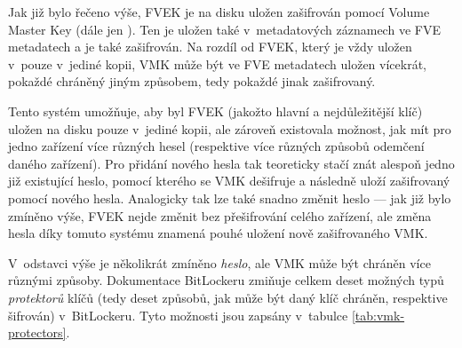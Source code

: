 
\label{sec:vmk}

Jak již bylo řečeno výše, FVEK je na disku uložen zašifrován pomocí Volume Master Key (dále jen ). Ten je uložen také v~metadatových záznamech ve FVE metadatech a je také zašifrován. Na rozdíl od FVEK, který je vždy uložen v~pouze v~jediné kopii, VMK může být ve FVE metadatech uložen vícekrát, pokaždé chráněný jiným způsobem, tedy pokaždé jinak zašifrovaný.

Tento systém umožňuje, aby byl FVEK (jakožto hlavní a nejdůležitější klíč) uložen na disku pouze v~jediné kopii, ale zároveň existovala možnost, jak mít pro jedno zařízení více různých hesel (respektive více různých způsobů odemčení daného zařízení)\cite{Kornblum2009}. Pro přidání nového hesla tak teoreticky stačí znát alespoň jedno již existující heslo\cite{Lich2016}, pomocí kterého se VMK dešifruje a následně uloží zašifrovaný pomocí nového hesla. Analogicky tak lze také snadno změnit heslo --- jak již bylo zmíněno výše, FVEK nejde změnit bez přešifrování celého zařízení, ale změna hesla díky tomuto systému znamená pouhé uložení nově zašifrovaného VMK.

V~odstavci výše je několikrát zmíněno \emph{heslo}, ale VMK může být chráněn více různými způsoby. Dokumentace BitLockeru \cite{Zxwr6wjYZUQ6z8Yo} zmiňuje celkem deset možných typů \emph{protektorů} klíčů (tedy deset způsobů, jak může být daný klíč chráněn, respektive šifrován) v~BitLockeru. Tyto možnosti jsou zapsány v~tabulce \ref{tab:vmk-protectors}.


